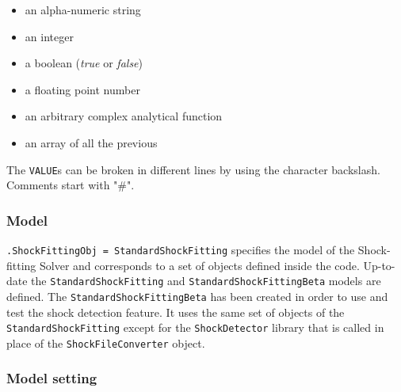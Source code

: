 \documentclass[11pt,a4paper,oneside]{article}
\begin{document}
\begin{itemize}
\item{an alpha-numeric string}
\item{an integer}
\item{a boolean (\textit{true} or \textit{false})}
\item{a floating point number}
\item{an arbitrary complex analytical function}
\item{an array of all the previous}
\end{itemize}

The \texttt{VALUE}s can be broken in different lines by using the character backslash.
Comments start with "\texttt{$\#$}".


\subsubsection{Model}
\label{subsubsec:model}

\hspace*{1cm} \texttt{.ShockFittingObj = StandardShockFitting}
\newline
\newline
specifies the model of the Shock-fitting Solver and corresponds to a set of objects defined inside the code.
\newline
Up-to-date the \texttt{StandardShockFitting} and \texttt{StandardShockFittingBeta} models are defined. 
\newline
The \texttt{StandardShockFittingBeta} has been created in order to use and test the shock detection feature. It uses the same set of objects of the \texttt{StandardShockFitting} except for the \texttt{ShockDetector} library that is called in place of the \texttt{ShockFileConverter} object.

\subsubsection{Model setting}
\label{subsubsec:model setting}
\end{document}
